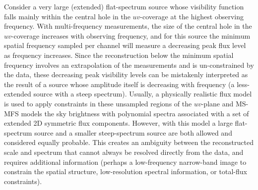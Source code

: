 \documentclass[structabstract]{stylefiles/aa}
\begin{document}
%



Consider a very large (extended) flat-spectrum source whose  
visibility function falls mainly within the
central hole in the $uv$-coverage at the highest observing frequency.
With multi-frequency measurements, the size of the central hole in the
$uv$-coverage increases with observing frequency,
and for this source the minimum spatial frequency sampled per 
channel will measure a decreasing peak flux level as frequency increases.
%
Since the reconstruction below the minimum spatial frequency
involves an extrapolation of the measurements %
and is un-constrained by
the data, these decreasing peak visibility levels can be mistakenly interpreted as
the result of a source whose amplitude itself is decreasing with frequency
(a less-extended source with a steep spectrum).
Usually, a physically realistic flux model is used to 
apply constraints in these unsampled regions of the $uv$-plane
and MS-MFS models the sky brightness with polynomial spectra associated
with a set of extended 2D symmetric flux components. 
However, with this model
a large flat-spectrum source and a smaller steep-spectrum source are both
allowed and considered equally probable.
This creates an ambiguity between the reconstructed scale and spectrum that 
cannot always be resolved directly from the data, and 
requires additional information (perhaps 
a low-frequency narrow-band image to constrain the spatial structure, 
low-resolution spectral information, or total-flux constraints).
\end{document}
